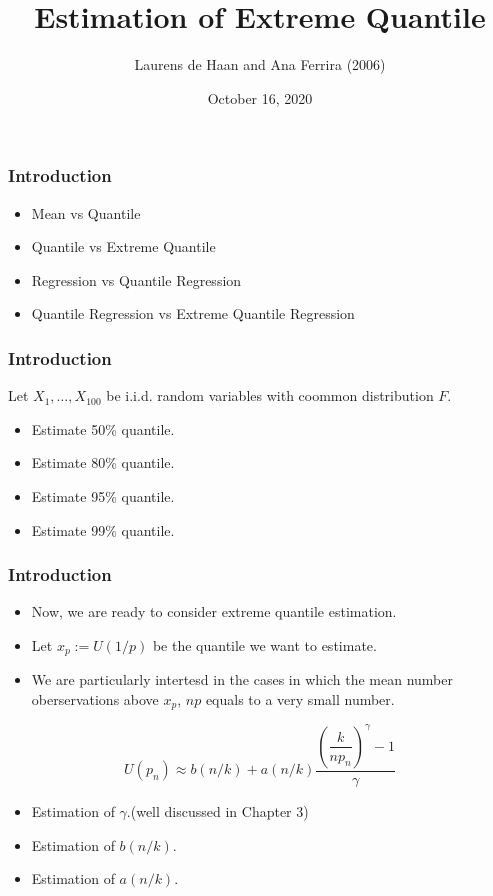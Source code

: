 \documentclass{beamer}
\title{Estimation of Extreme Quantile}
\author{Laurens de Haan and Ana Ferrira (2006)}
\date{October 16, 2020}
\begin{document}
 

\begin{frame}
    \titlepage
\end{frame}


\begin{frame}
    \frametitle{Introduction}
\begin{itemize}
    \item Mean vs Quantile
    \item Quantile vs Extreme Quantile
    \item Regression vs Quantile Regression
    \item Quantile Regression vs Extreme Quantile Regression
\end{itemize}
\end{frame}

\begin{frame}
    \frametitle{Introduction}
    Let $X_1,\dots,X_{100}$ be i.i.d. random variables with coommon distribution $F$.

    \begin{itemize}
        \item Estimate 50\% quantile.
        \item Estimate 80\% quantile.
        \item Estimate 95\% quantile.
        \item Estimate 99\% quantile.
    \end{itemize}
    

\end{frame}

\begin{frame}
    \frametitle{Introduction}
    \begin{itemize}
        \item Now, we are ready to consider extreme quantile estimation. 
        \item Let $x_p:=U(1/p)$  be the quantile we want to estimate. 
        \item     We are particularly intertesd in the cases in which the mean number oberservations above $x_p$, $np$ equals to a very small number.
    \end{itemize}

$$
U(p_n) \approx b(n/k)+a(n/k)\dfrac{\left(\dfrac{k}{np_n}\right)^{\gamma}-1}{\gamma}
$$
\begin{itemize}
    \item Estimation of $\gamma$.(well discussed in Chapter 3)
    \item Estimation of $b(n/k)$. 
    \item Estimation of $a(n/k)$.
\end{itemize}
    

\end{frame}
\end{document}
